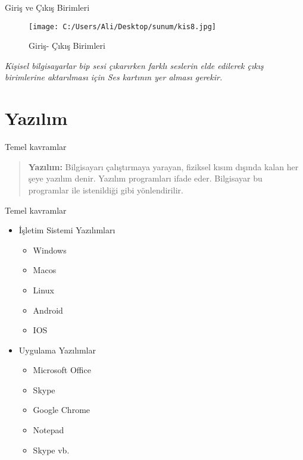 \documentclass[
  12pt,
  ignorenonframetext,
]{beamer}
\providecommand{\tightlist}{%
  \setlength{\itemsep}{0pt}\setlength{\parskip}{0pt}}
\begin{document}
\begin{frame}{Giriş ve Çıkış Birimleri}
\protect\hypertarget{giriux15f-ve-uxe7ux131kux131ux15f-birimleri-1}{}

\begin{figure}
\centering
\texttt{[image: C:/Users/Ali/Desktop/sunum/kis8.jpg]}
\caption{Giriş- Çıkış Birimleri}
\end{figure}

\emph{Kişisel bilgisayarlar bip sesi çıkarırken farklı seslerin elde
edilerek çıkış birimlerine aktarılması için Ses kartının yer alması
gerekir.}

\end{frame}

\hypertarget{yazux131lux131m}{%
\section{Yazılım}\label{yazux131lux131m}}

\begin{frame}{Temel kavramlar}
\protect\hypertarget{temel-kavramlar}{}

\justify

\begin{quote}
\textbf{Yazılım:} Bilgisayarı çalıştırmaya yarayan, fiziksel kısım
dışında kalan her şeye yazılım denir. Yazılım programları ifade eder.
Bilgisayar bu programlar ile istenildiği gibi yönlendirilir.
\end{quote}

\end{frame}

\begin{frame}{Temel kavramlar}
\protect\hypertarget{temel-kavramlar-1}{}

\begin{itemize}
\tightlist
\item
  İşletim Sistemi Yazılımları

  \begin{itemize}
  \tightlist
  \item
    Windows
  \item
    Macos
  \item
    Linux
  \item
    Android
  \item
    IOS
  \end{itemize}
\item
  Uygulama Yazılımlar

  \begin{itemize}
  \tightlist
  \item
    Microsoft Office
  \item
    Skype
  \item
    Google Chrome
  \item
    Notepad
  \item
    Skype vb.
  \end{itemize}
\end{itemize}

\end{frame}
\end{document}
